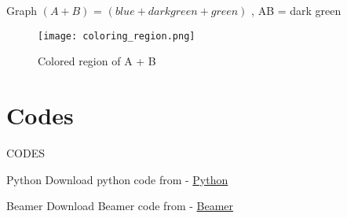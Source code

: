\documentclass{beamer}
\providecommand{\brak}[1]{\ensuremath{\left(#1\right)}}
\begin{document}
\begin{frame}{Graph}
 \brak{A + B} = \brak{blue + dark green + green} , AB =  dark green 
   \begin{figure}[!ht]
		\centering
		\texttt{[image: coloring\_region.png]}
		\caption{Colored region of  A + B }
		\label{fig-1}
	\end{figure} 
\end{frame}


\section{Codes}
\begin{frame}{CODES}
    \begin{block}{Python}
         Download python code from - \href{https://github.com/Donal-08/Assignment-7/blob/main/code/line.py}{Python}
    \end{block}

 \begin{block}{Beamer}
         Download Beamer code from - \href{https://github.com/Donal-08/Assignment-7/blob/main/beamer.tex}{Beamer}
    \end{block}
\end{frame} 
\end{document}

